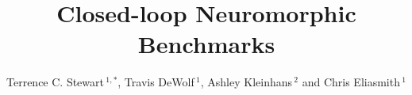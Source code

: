 \documentclass{frontiersSCNS} %
\def\firstAuthorLast{Stewart {et~al.}} %
\def\Authors{Terrence C. Stewart\,$^{1,*}$, Travis DeWolf\,$^{1}$, Ashley Kleinhans\,$^{2}$ and Chris Eliasmith\,$^1$}
\begin{document}
\onecolumn
{}

\title[Closed-loop Neuromorphic Benchmarks]{Closed-loop Neuromorphic Benchmarks} 

\author[\firstAuthorLast ]{\Authors} %
\address{} %
\correspondance{} %

\extraAuth{}%

\maketitle

\end{document}
